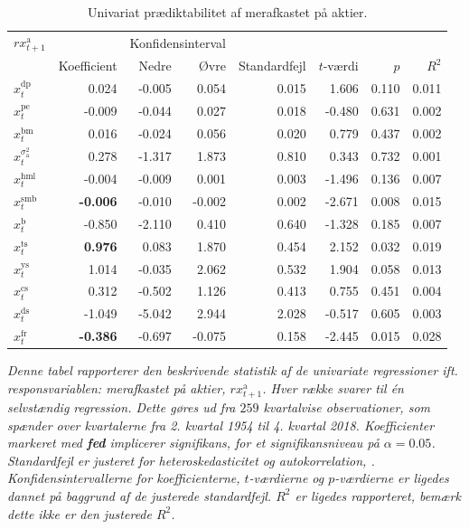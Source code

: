 \documentclass[
  a4paper,
  oneside]{memoir}
\begin{document}
\begin{table}[H]

\caption{\label{tab:UNI-ak}Univariat prædiktabilitet af merafkastet på aktier.}
\centering
\begin{threeparttable}
\begin{tabular}[t]{lrrrrrrr}
\toprule
\multicolumn{1}{c}{$rx_{t+1}^{\text{a}}$} & \multicolumn{1}{c}{ } & \multicolumn{2}{c}{Konfidensinterval} & \multicolumn{4}{c}{ } \\
\cmidrule(l{3pt}r{3pt}){1-1} \cmidrule(l{3pt}r{3pt}){3-4}
  & Koefficient & Nedre & Øvre & Standardfejl & $t$-værdi & $p$ & $R^2$\\
\midrule
\rowcolor{gray!6}  $x_t^{\text{dp}}$ & 0.024 & -0.005 & 0.054 & 0.015 & 1.606 & 0.110 & 0.011\\
$x_t^{\text{pe}}$ & -0.009 & -0.044 & 0.027 & 0.018 & -0.480 & 0.631 & 0.002\\
\rowcolor{gray!6}  $x_t^{\text{bm}}$ & 0.016 & -0.024 & 0.056 & 0.020 & 0.779 & 0.437 & 0.002\\
$x_t^{\sigma_{\text{a}}^2}$ & 0.278 & -1.317 & 1.873 & 0.810 & 0.343 & 0.732 & 0.001\\
\rowcolor{gray!6}  $x_t^{\text{hml}}$ & -0.004 & -0.009 & 0.001 & 0.003 & -1.496 & 0.136 & 0.007\\
$x_t^{\text{smb}}$ & \textbf{-0.006} & -0.010 & -0.002 & 0.002 & -2.671 & 0.008 & 0.015\\
\rowcolor{gray!6}  $x_t^{\text{b}}$ & -0.850 & -2.110 & 0.410 & 0.640 & -1.328 & 0.185 & 0.007\\
$x_t^{\text{ts}}$ & \textbf{ 0.976} & 0.083 & 1.870 & 0.454 & 2.152 & 0.032 & 0.019\\
\rowcolor{gray!6}  $x_t^{\text{ys}}$ & 1.014 & -0.035 & 2.062 & 0.532 & 1.904 & 0.058 & 0.013\\
$x_t^{\text{cs}}$ & 0.312 & -0.502 & 1.126 & 0.413 & 0.755 & 0.451 & 0.004\\
\rowcolor{gray!6}  $x_t^{\text{ds}}$ & -1.049 & -5.042 & 2.944 & 2.028 & -0.517 & 0.605 & 0.003\\
$x_t^{\text{fr}}$ & \textbf{-0.386} & -0.697 & -0.075 & 0.158 & -2.445 & 0.015 & 0.028\\
\bottomrule
\end{tabular}
\begin{tablenotes}
\item \textit{Denne tabel rapporterer den beskrivende statistik af de univariate regressioner ift. responsvariablen: merafkastet på aktier, $rx_{t+1}^{\text{a}}$. Hver række svarer til én selvstændig regression. Dette gøres ud fra $259$ kvartalvise observationer, som spænder over kvartalerne fra 2. kvartal 1954 til 4. kvartal 2018. Koefficienter markeret med \textbf{fed} implicerer signifikans, for et signifikansniveau på $\alpha=0.05$. Standardfejl er justeret for heteroskedasticitet og autokorrelation, \citep{Newey1987}. Konfidensintervallerne for koefficienterne, $t$-værdierne og $p$-værdierne er ligedes dannet på baggrund af de justerede standardfejl. $R^2$ er ligedes rapporteret, bemærk dette ikke er den justerede $R^2$.}
\end{tablenotes}
\end{threeparttable}
\end{table}
\end{document}
